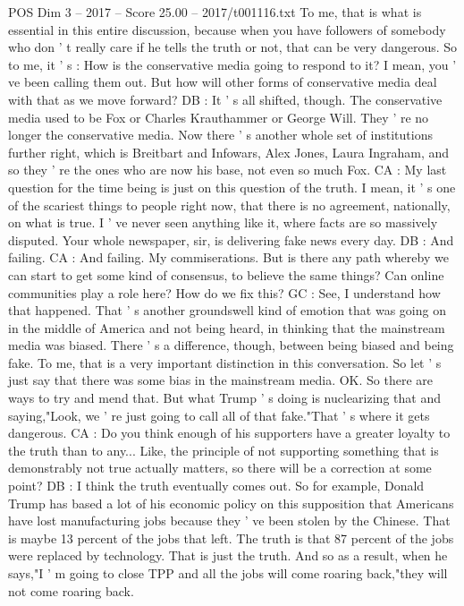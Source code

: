 \begin{textsample}{POS Dim 3 – 2017 – Score 25.00 – 2017/t001116.txt}
To me, that is what is essential in this entire discussion, because when you have followers of somebody who don ' t really care if he tells the truth or not, that can be very dangerous.
So to me, it ' s : How is the conservative media going to respond to it?
I mean, you ' ve been calling them out.
But how will other forms of conservative media deal with that as we move forward?
DB : It ' s all shifted, though.
The conservative media used to be Fox or Charles Krauthammer or George Will.
They ' re no longer the conservative media.
Now there ' s another whole set of institutions further right, which is Breitbart and Infowars, Alex Jones, Laura Ingraham, and so they ' re the ones who are now his base, not even so much Fox.
CA : My last question for the time being is just on this question of the truth.
I mean, it ' s one of the scariest things to people right now, that there is no agreement, nationally, on what is true.
I ' ve never seen anything like it, where facts are so massively disputed.
Your whole newspaper, sir, is delivering fake news every day.
DB : And failing.
CA : And failing.
My commiserations.
But is there any path whereby we can start to get some kind of consensus, to believe the same things?
Can online communities play a role here?
How do we fix this?
GC : See, I understand how that happened.
That ' s another groundswell kind of emotion that was going on in the middle of America and not being heard, in thinking that the mainstream media was biased.
There ' s a difference, though, between being biased and being fake.
To me, that is a very important distinction in this conversation.
So let ' s just say that there was some bias in the mainstream media.
OK.
So there are ways to try and mend that.
But what Trump ' s doing is nuclearizing that and saying,"Look, we ' re just going to call all of that fake."That ' s where it gets dangerous.
CA : Do you think enough of his supporters have a greater loyalty to the truth than to any...
Like, the principle of not supporting something that is demonstrably not true actually matters, so there will be a correction at some point?
DB : I think the truth eventually comes out.
So for example, Donald Trump has based a lot of his economic policy on this supposition that Americans have lost manufacturing jobs because they ' ve been stolen by the Chinese.
That is maybe 13 percent of the jobs that left.
The truth is that 87 percent of the jobs were replaced by technology.
That is just the truth.
And so as a result, when he says,"I ' m going to close TPP and all the jobs will come roaring back,"they will not come roaring back.

\end{textsample}
